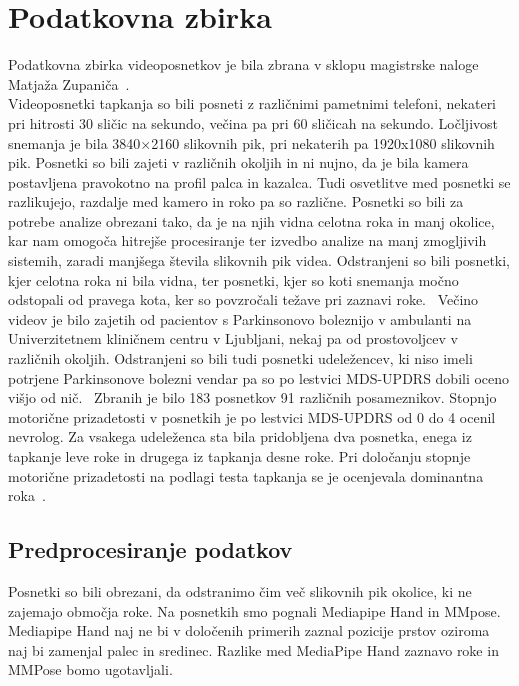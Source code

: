 \documentclass[a4paper,12pt]{article}
\begin{document}
\section{Podatkovna zbirka}

Podatkovna zbirka videoposnetkov je bila zbrana v sklopu magistrske naloge Matjaža Zupaniča~\cite{Zupanic}.\\

Videoposnetki tapkanja so bili posneti z različnimi pametnimi telefoni, nekateri pri hitrosti 30 sličic na 
sekundo, večina pa pri 60 sličicah na sekundo. Ločljivost snemanja je bila 3840$\times$2160 slikovnih pik, pri 
nekaterih pa 1920x1080 slikovnih pik. Posnetki so bili zajeti v različnih okoljih in ni nujno, da je bila 
kamera postavljena pravokotno na profil palca in kazalca. Tudi osvetlitve med posnetki se razlikujejo, razdalje 
med kamero in roko pa so različne. Posnetki so bili za potrebe analize obrezani tako, da je na njih vidna 
celotna roka in manj okolice, kar nam omogoča hitrejše procesiranje ter izvedbo analize na manj 
zmogljivih sistemih, zaradi manjšega števila slikovnih pik videa. Odstranjeni so bili posnetki, kjer 
celotna roka ni bila vidna, ter posnetki, kjer so koti snemanja močno odstopali od pravega kota, ker so 
povzročali težave pri zaznavi roke. \
Večino videov je bilo zajetih od pacientov s Parkinsonovo boleznijo v ambulanti na Univerzitetnem kliničnem 
centru v Ljubljani, nekaj pa od prostovoljcev v različnih okoljih. Odstranjeni so bili tudi posnetki udeležencev, ki niso imeli potrjene Parkinsonove bolezni
vendar pa so po lestvici MDS-UPDRS dobili oceno višjo od nič. \
Zbranih je bilo 183 posnetkov 91 različnih posameznikov. Stopnjo motorične prizadetosti v posnetkih je po 
lestvici MDS-UPDRS od 0 do 4 ocenil nevrolog. Za vsakega udeleženca sta bila pridobljena dva posnetka, enega 
iz tapkanje leve roke in drugega iz tapkanja desne roke. Pri določanju stopnje motorične prizadetosti na 
podlagi testa tapkanja se je ocenjevala dominantna roka~\cite{Zupanic}. 

\subsection{Predprocesiranje podatkov}

Posnetki so bili obrezani, da odstranimo čim več slikovnih pik okolice, ki ne zajemajo območja roke. Na posnetkih 
smo pognali Mediapipe Hand in MMpose. Mediapipe Hand naj ne bi v določenih primerih zaznal pozicije prstov 
oziroma naj bi zamenjal palec in sredinec. Razlike med MediaPipe Hand zaznavo roke in MMPose bomo ugotavljali. \\
\end{document}
